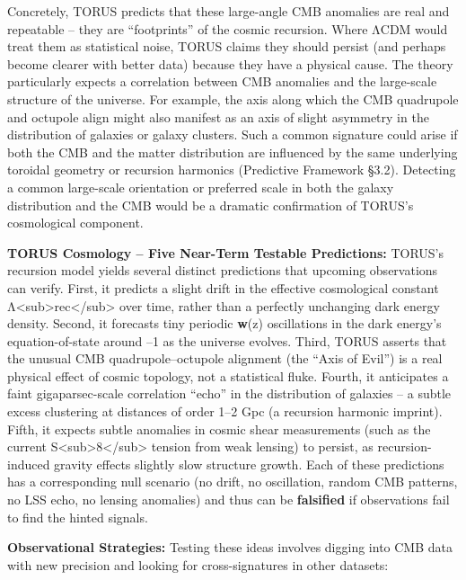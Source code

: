 \documentclass[
]{article}
\begin{document}
Concretely, TORUS predicts that these large-angle CMB anomalies are real
and repeatable -- they are ``footprints'' of the cosmic recursion. Where
ΛCDM would treat them as statistical noise, TORUS claims they should
persist (and perhaps become clearer with better data) because they have
a physical cause. The theory particularly expects a correlation between
CMB anomalies and the large-scale structure of the universe. For
example, the axis along which the CMB quadrupole and octupole align
might also manifest as an axis of slight asymmetry in the distribution
of galaxies or galaxy clusters. Such a common signature could arise if
both the CMB and the matter distribution are influenced by the same
underlying toroidal geometry or recursion harmonics (Predictive
Framework §3.2). Detecting a common large-scale orientation or preferred
scale in both the galaxy distribution and the CMB would be a dramatic
confirmation of TORUS's cosmological component.

\textbf{TORUS Cosmology -- Five Near-Term Testable Predictions:} TORUS's
recursion model yields several distinct predictions that upcoming
observations can verify. First, it predicts a slight drift in the
effective cosmological constant
Λ\textless sub\textgreater rec\textless/sub\textgreater{} over time,
rather than a perfectly unchanging dark energy density. Second, it
forecasts tiny periodic \textbf{w}(z) oscillations in the dark energy's
equation-of-state around --1 as the universe evolves. Third, TORUS
asserts that the unusual CMB quadrupole--octupole alignment (the ``Axis
of Evil'') is a real physical effect of cosmic topology, not a
statistical fluke. Fourth, it anticipates a faint gigaparsec-scale
correlation ``echo'' in the distribution of galaxies -- a subtle excess
clustering at distances of order 1--2 Gpc (a recursion harmonic
imprint). Fifth, it expects subtle anomalies in cosmic shear
measurements (such as the current
S\textless sub\textgreater8\textless/sub\textgreater{} tension from weak
lensing) to persist, as recursion-induced gravity effects slightly slow
structure growth. Each of these predictions has a corresponding null
scenario (no drift, no oscillation, random CMB patterns, no LSS echo, no
lensing anomalies) and thus can be \textbf{falsified} if observations
fail to find the hinted signals.

\textbf{Observational Strategies:} Testing these ideas involves digging
into CMB data with new precision and looking for cross-signatures in
other datasets:
\end{document}
